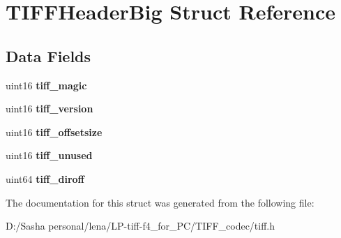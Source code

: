\hypertarget{struct_t_i_f_f_header_big}{}\section{T\+I\+F\+F\+Header\+Big Struct Reference}
\label{struct_t_i_f_f_header_big}
\subsection*{Data Fields}
\begin{DoxyCompactItemize}
\item 
\hypertarget{struct_t_i_f_f_header_big_ac73e530bcf1587e88771c5806cfa6504}{}uint16 {\bfseries tiff\+\_\+magic}\label{struct_t_i_f_f_header_big_ac73e530bcf1587e88771c5806cfa6504}

\item 
\hypertarget{struct_t_i_f_f_header_big_a86111434332ba79982db1a0e14d592e5}{}uint16 {\bfseries tiff\+\_\+version}\label{struct_t_i_f_f_header_big_a86111434332ba79982db1a0e14d592e5}

\item 
\hypertarget{struct_t_i_f_f_header_big_a3d9d93a08958fe13b8909872f9841337}{}uint16 {\bfseries tiff\+\_\+offsetsize}\label{struct_t_i_f_f_header_big_a3d9d93a08958fe13b8909872f9841337}

\item 
\hypertarget{struct_t_i_f_f_header_big_ac820c5fa627afa5ff53407308c98d808}{}uint16 {\bfseries tiff\+\_\+unused}\label{struct_t_i_f_f_header_big_ac820c5fa627afa5ff53407308c98d808}

\item 
\hypertarget{struct_t_i_f_f_header_big_a047f6dac58eb4e49f18f136429fe7017}{}uint64 {\bfseries tiff\+\_\+diroff}\label{struct_t_i_f_f_header_big_a047f6dac58eb4e49f18f136429fe7017}

\end{DoxyCompactItemize}


The documentation for this struct was generated from the following file\+:\begin{DoxyCompactItemize}
\item 
D\+:/\+Sasha personal/lena/\+L\+P-\/tiff-\/f4\+\_\+for\+\_\+\+P\+C/\+T\+I\+F\+F\+\_\+codec/tiff.\+h\end{DoxyCompactItemize}
